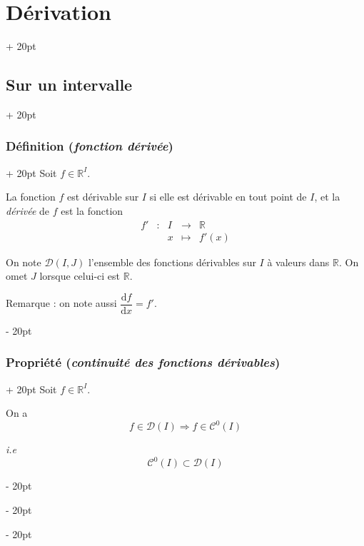 \documentclass[a4paper, 12pt, twoside]{article}
\newcommand{\R}{\mathbb{R}} %
\newcommand{\ind}[1][20pt]{\advance\leftskip + #1}
\newcommand{\deind}[1][20pt]{\advance\leftskip - #1}
\newenvironment{indt}[2][20pt]{#2 \par \ind[#1]}{\par \deind} %
\begin{document}
\begin{indt}{\section{Dérivation}}
        \vspace{12pt}
        
        \begin{indt}{\subsection{Sur un intervalle}}
            \begin{indt}{\subsubsection{Définition (\textit{fonction dérivée})}}
                Soit $f \in \R^I$.

                La fonction $f$ est dérivable sur $I$ si elle est dérivable en tout point de $I$, et la \textit{dérivée} de $f$ est la fonction
                \[
                    \begin{array}{rcccc}
                        f' & : & I & \longrightarrow & \R
                        \\
                           && x & \longmapsto & f'(x)
                    \end{array}
                \]

                On note $\mathcal D(I, J)$ l'ensemble des fonctions dérivables sur $I$ à valeurs dans $\R$. On omet $J$ lorsque celui-ci est $\R$.

                Remarque : on note aussi $\dfrac{\mathrm df}{\mathrm dx} = f'$.
            \end{indt}

            \vspace{12pt}
            
            \begin{indt}{\subsubsection{Propriété (\textit{continuité des fonctions dérivables})}}
                Soit $f \in \R^I$.

                On a
                \[
                    f \in \mathcal D(I)
                    \Rightarrow
                    f \in \mathcal C^0(I)
                \]

                \textit{i.e}
                \[
                    \mathcal C^0(I) \subset \mathcal D(I)
                \]
            \end{indt}

            \vspace{12pt}
            

\end{indt}
\end{indt}
\end{document}
